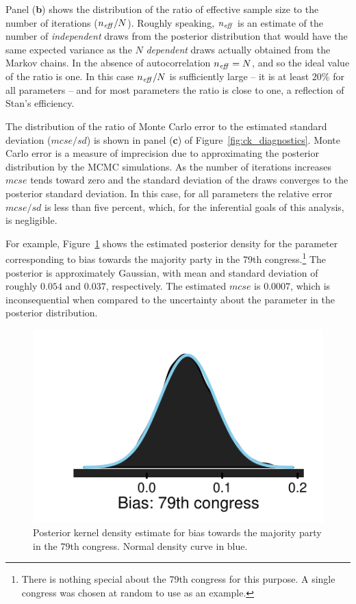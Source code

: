 Panel ({\bf b}) shows the distribution of the ratio of effective sample size to the number of 
iterations ($n_{\it eff}/N$). Roughly speaking, $n_{\it eff}$ is an estimate of the number of 
{\it independent} draws from the posterior distribution that would have the same expected 
variance as the $N$ {\it dependent} draws actually obtained from the 
Markov chains. In the absence of autocorrelation $n_{\it eff} = N$, and so the ideal value of the ratio is one. 
In this case $n_{\it eff}/N$ is sufficiently large -- it is at least 20\% for all parameters -- and 
for most parameters the ratio is close to one, a reflection of Stan's efficiency. 


The distribution of the ratio of Monte Carlo error to the estimated standard 
deviation ($mcse/sd$) is shown in panel ({\bf c}) of Figure~\ref{fig:ck_diagnostics}. 
Monte Carlo error is a measure of imprecision due to approximating 
the posterior distribution by the MCMC simulations. As the number of iterations increases 
$mcse$ tends toward zero and the standard deviation of the draws converges to the posterior 
standard deviation. In this case, for all parameters the relative error $mcse/sd$ is less 
than five percent, which, for the inferential goals of this analysis, is negligible. 

For example, Figure~\ref{fig:ck_example_posterior} shows the estimated 
posterior density for the parameter corresponding to bias towards the majority party in the 79th 
congress.\footnote{There is nothing special about the 79th congress for this purpose. A single 
congress was chosen at random to use as an example.} The posterior is approximately Gaussian, 
with mean and standard deviation of roughly $0.054$ and $0.037$, respectively. The 
estimated $mcse$ is $0.0007$, which is inconsequential when compared to the uncertainty about 
the parameter in the posterior distribution.   


\begin{figure}[h]
\centering
	\includegraphics[scale=0.75]{sections/figs/example_posterior}
\caption{Posterior kernel density estimate for bias towards the majority party in the 79th congress. 
Normal density curve in blue.}
\label{fig:ck_example_posterior}
\end{figure}


